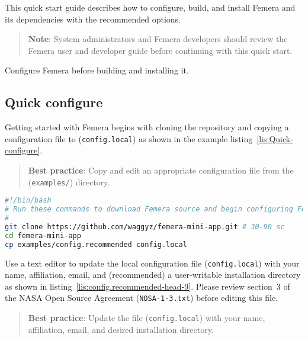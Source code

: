 

This quick start guide describes how to configure, build, and install
Femera and its dependencies with the recommended options.
\begin{verse}
\textbf{Note}:
System administrators and Femera developers should
review the Femera user and developer guide before continuing with this quick
start.
\end{verse}
Configure Femera before building and installing it.

\subsection{Quick configure\label{subsec:Quick-configure}}

Getting started with Femera begins with cloning the repository and
copying a configuration file to (\texttt{config.local}) as shown in
the example listing~\ref{lis:Quick-configure}.
\begin{verse}
\textbf{Best practice}:
Copy and edit an appropriate configuration file from
the (\texttt{examples/}) directory.
\end{verse}
\begin{comment}
tdd:tests/pre-build/config\_local\_is\_valid\_makefile.py
\end{comment}

\begin{lstlisting}[caption={Femera initial configuration steps and
time estimate},label={lis:Quick-configure},language=bash,float=ht]
#!/bin/bash
# Run these commands to download Femera source and begin configuring Femera.
#
git clone https://github.com/waggyz/femera-mini-app.git # 30-90 sc
cd femera-mini-app
cp examples/config.recommended config.local
\end{lstlisting}

Use a text editor to update the local configuration file (\texttt{config.local})
with your name, affiliation, email, and (recommended) a user-writable
installation directory as shown in listing~\ref{lis:config.recommended-head-9}.
Please review section~3 of the NASA Open Source Agreement (\texttt{NOSA-1-3.txt})
before editing this file.
\begin{comment}
tdd:tests/pre-build/file-does-exist.sh NOSA-1-3.txt
\end{comment}
\begin{verse}
\textbf{Best practice}:
Update the file (\texttt{config.local}) with
your name, affiliation, email, and desired installation directory.
\end{verse}
\begin{comment}
tdd:tests/pre-build/user\_did\_change\_BUILT\_BY.py
\end{comment}

